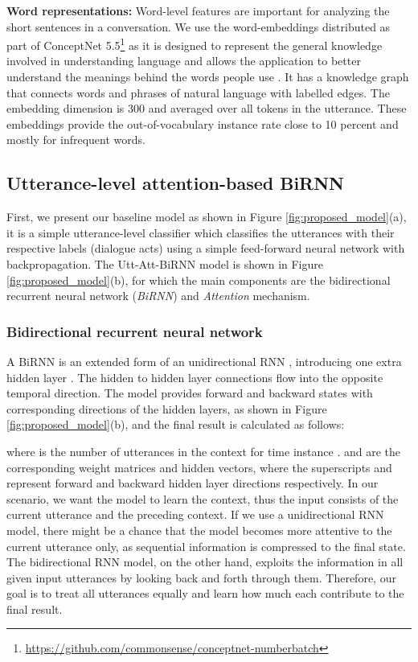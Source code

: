 \documentclass[a4paper]{article}
\begin{document}
\textbf{Word representations:} Word-level features are important for analyzing the short sentences in a conversation. We use the word-embeddings distributed as part of ConceptNet 5.5\footnote{\url{https://github.com/commonsense/conceptnet-numberbatch}} as it is designed to represent the general knowledge involved
in understanding language and allows the application to better understand
the meanings behind the words people use \cite{speer2017conceptnet}. It has a knowledge graph that connects words and phrases of natural language with labelled edges. 
The embedding dimension is 300 and averaged over all tokens in the utterance. These embeddings provide the out-of-vocabulary instance rate close to 10 percent and mostly for infrequent words.


\subsection{Utterance-level attention-based BiRNN}

First, we present our baseline model as shown in Figure \ref{fig:proposed_model}(a), it is a simple utterance-level classifier which classifies the utterances with their respective labels (dialogue acts) using a simple feed-forward neural network with backpropagation.  
The Utt-Att-BiRNN model is shown in Figure \ref{fig:proposed_model}(b), for which the main components are the bidirectional recurrent neural network (\textit{BiRNN}) and \textit{Attention} mechanism.

\subsubsection{Bidirectional recurrent neural network} 

A BiRNN is an extended form of an unidirectional RNN \cite{elman1990finding}, introducing one extra hidden layer \cite{GravesBiRnn,SchusterBiRnn}. The hidden to hidden layer connections flow into the opposite temporal direction. 
The model provides forward and backward states with corresponding directions of the hidden layers, as shown in Figure \ref{fig:proposed_model}(b), and the final result is calculated as follows:
 
 
 
where  is the number of utterances in the context for time instance .
 and  are the corresponding weight matrices and hidden vectors, where the superscripts  and  represent forward and backward hidden layer directions respectively. 
In our scenario, we want the model to learn the context, thus the input consists of the current utterance and the preceding context. If we use a unidirectional RNN model, there might be a chance that the model becomes more attentive to the current utterance only, as sequential information is compressed to the final state.
The bidirectional RNN model, on the other hand, exploits the information in all given input utterances by looking back and forth through them. 
Therefore, our goal is to treat all utterances equally and learn how much each contribute to the final result. 
\end{document}
